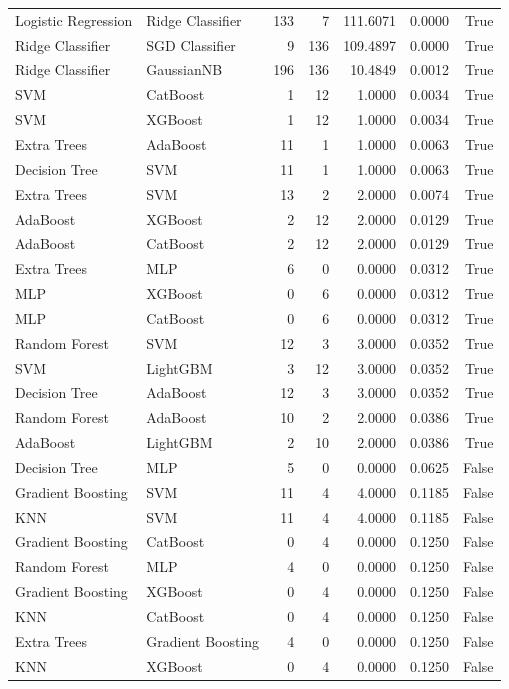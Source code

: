 \begin{table}
\begin{tabular}{llrrrrr}
Logistic Regression & Ridge Classifier & 133 & 7 & 111.6071 & 0.0000 & True \\
Ridge Classifier & SGD Classifier & 9 & 136 & 109.4897 & 0.0000 & True \\
Ridge Classifier & GaussianNB & 196 & 136 & 10.4849 & 0.0012 & True \\
SVM & CatBoost & 1 & 12 & 1.0000 & 0.0034 & True \\
SVM & XGBoost & 1 & 12 & 1.0000 & 0.0034 & True \\
Extra Trees & AdaBoost & 11 & 1 & 1.0000 & 0.0063 & True \\
Decision Tree & SVM & 11 & 1 & 1.0000 & 0.0063 & True \\
Extra Trees & SVM & 13 & 2 & 2.0000 & 0.0074 & True \\
AdaBoost & XGBoost & 2 & 12 & 2.0000 & 0.0129 & True \\
AdaBoost & CatBoost & 2 & 12 & 2.0000 & 0.0129 & True \\
Extra Trees & MLP & 6 & 0 & 0.0000 & 0.0312 & True \\
MLP & XGBoost & 0 & 6 & 0.0000 & 0.0312 & True \\
MLP & CatBoost & 0 & 6 & 0.0000 & 0.0312 & True \\
Random Forest & SVM & 12 & 3 & 3.0000 & 0.0352 & True \\
SVM & LightGBM & 3 & 12 & 3.0000 & 0.0352 & True \\
Decision Tree & AdaBoost & 12 & 3 & 3.0000 & 0.0352 & True \\
Random Forest & AdaBoost & 10 & 2 & 2.0000 & 0.0386 & True \\
AdaBoost & LightGBM & 2 & 10 & 2.0000 & 0.0386 & True \\
Decision Tree & MLP & 5 & 0 & 0.0000 & 0.0625 & False \\
Gradient Boosting & SVM & 11 & 4 & 4.0000 & 0.1185 & False \\
KNN & SVM & 11 & 4 & 4.0000 & 0.1185 & False \\
Gradient Boosting & CatBoost & 0 & 4 & 0.0000 & 0.1250 & False \\
Random Forest & MLP & 4 & 0 & 0.0000 & 0.1250 & False \\
Gradient Boosting & XGBoost & 0 & 4 & 0.0000 & 0.1250 & False \\
KNN & CatBoost & 0 & 4 & 0.0000 & 0.1250 & False \\
Extra Trees & Gradient Boosting & 4 & 0 & 0.0000 & 0.1250 & False \\
KNN & XGBoost & 0 & 4 & 0.0000 & 0.1250 & False \\

\end{tabular}
\end{table}
